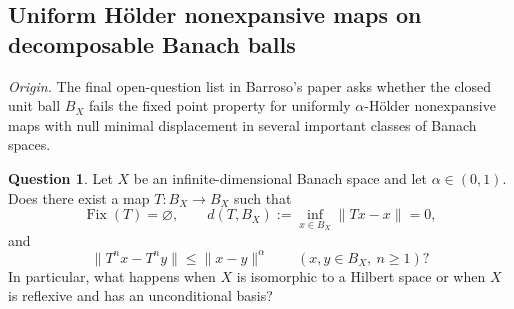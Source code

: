 \documentclass[11pt,reqno]{amsart}
\theoremstyle{plain}
\theoremstyle{definition}
\newtheorem{question}[question]{Question}
\begin{document}
\subsection{Uniform H\"older nonexpansive maps on decomposable Banach balls}
\label{sec:selected-holder-maps}

\noindent\textit{Origin.} The final open-question list in Barroso's paper \cite{BarrosoHolderContractive} asks whether the closed unit ball $B_X$ fails the fixed point property for uniformly $\alpha$-H\"older nonexpansive maps with null minimal displacement in several important classes of Banach spaces.

\begin{question}
Let $X$ be an infinite-dimensional Banach space and let $\alpha\in(0,1)$. Does there exist a map $T\colon B_X\to B_X$ such that
\begin{equation*}
 \operatorname{Fix}(T)=\varnothing,
 \qquad
 d(T,B_X):=\inf_{x\in B_X}\|Tx-x\|=0,
\end{equation*}
and
\begin{equation*}
 \|T^n x-T^n y\|\leq \|x-y\|^\alpha
 \qquad(x,y\in B_X,\ n\geq1)?
\end{equation*}
In particular, what happens when $X$ is isomorphic to a Hilbert space or when $X$ is reflexive and has an unconditional basis?
\end{question}
\end{document}
